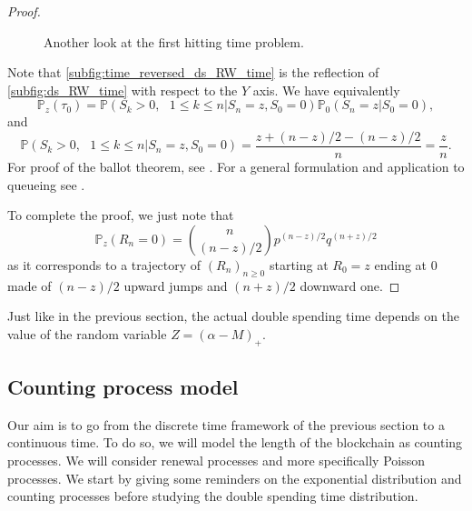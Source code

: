 \begin{proof}
\begin{remark}
\begin{figure}[ht!]
\begin{center}
{\begin{tikzpicture}
\end{tikzpicture}
\label{subfig:time_reversed_ds_RW_time}
}
\end{center}
\caption{Another look at the first hitting time problem.}
\label{fig:time_reversed_double_spending_time}
\end{figure}
Note that \cref{subfig:time_reversed_ds_RW_time} is the reflection of \cref{subfig:ds_RW_time} with respect to the $Y$ axis. We have equivalently
$$
\mathbb{P}_z(\tau_0) = \mathbb{P}(S_k>0,\text{ }1\leq k\leq n|S_n = z, S_0 = 0)\mathbb{P}_0(S_n = z|S_0=0),
$$
and 
$$
\mathbb{P}(S_k>0,\text{ }1\leq k\leq n|S_n = z, S_0 = 0) = \frac{z+(n-z)/2-(n-z)/2}{n} = \frac{z}{n}.
$$
For proof of the ballot theorem, see \citet{Renault2007}. For a general formulation and application to queueing see \citet{Takacs1962}.
\end{remark}
To complete the proof, we just note that 
$$
\mathbb{P}_z(R_n = 0) = \binom{n}{(n-z) / 2}p^{(n-z) / 2}q^{(n
+z) / 2}
$$
as it corresponds to a trajectory of $(R_n)_{n \geq0}$ starting at $R_0 = z$ ending at $0$ made of $(n-z)/2$ upward jumps and $(n+z)/2$ downward one.
\end{proof}
Just like in the previous section, the actual double spending time depends on the value of the random variable $Z = (\alpha -M)_+$.

\subsection{Counting process model}\label{sec:counting_process}
Our aim is to go from the discrete time framework of the previous section to a continuous time. To do so, we will model the length of the blockchain as counting processes. We will consider renewal processes and more specifically Poisson processes. We start by giving some reminders on the exponential distribution and counting processes before studying the double spending time distribution.

